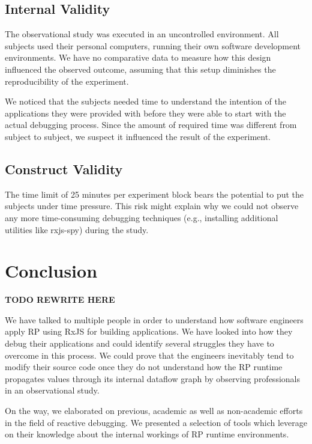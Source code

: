 \documentclass[sigplan,screen,review]{acmart}
\begin{document}
\subsection{Internal Validity}

The observational study was executed in an uncontrolled environment. All subjects used their personal computers, running their own software development environments. We have no comparative data to measure how this design influenced the observed outcome, assuming that this setup diminishes the reproducibility of the experiment.

We noticed that the subjects needed time to understand the intention of the applications they were provided with before they were able to start with the actual debugging process. Since the amount of required time was different from subject to subject, we suspect it influenced the result of the experiment.

\subsection{Construct Validity}

The time limit of 25 minutes per experiment block bears the potential to put the subjects under time pressure. This risk might explain why we could not observe any more time-consuming debugging techniques (e.g., installing additional utilities like rxjs-spy) during the study.


\section{Conclusion}
\label{sec:conclusion}

\textbf{TODO REWRITE HERE}

We have talked to multiple people in order to understand how software engineers apply RP using RxJS for building applications. We have looked into how they debug their applications and could identify several struggles they have to overcome in this process. We could prove that the engineers inevitably tend to modify their source code once they do not understand how the RP runtime propagates values through its internal dataflow graph by observing professionals in an observational study.

On the way, we elaborated on previous, academic as well as non-academic efforts in the field of reactive debugging. We presented a selection of tools which leverage on their knowledge about the internal workings of RP runtime environments.
\end{document}
